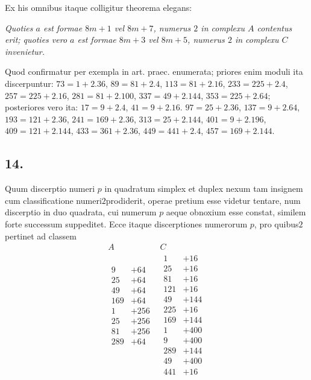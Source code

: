 \documentclass[twoside,12pt, showframe]{memoir}
\begin{document}
Ex his omnibus itaque colligitur theorema elegans:
 
\textit{Quoties \(a\) est formae \(8 m+1\) vel \(8 m+7\), numerus \(2\) in complexu \(A\) contentus erit; quoties vero \(a\) est formae \(8 m+3\) vel \(8 m+5\), numerus \(2\) in complexu \(C\) invenietur.}
 
Quod confirmatur per exempla in art. praec. enumerata; priores enim moduli ita discerpuntur: \(73=1+2.36\), \(89=81+2.4\), \(113=81+2.16\), \(233=225+2.4\), \(257=225+2.16\), \(281=81+2.100\), \(337=49+2.144\), \(353=225+2.64\); posteriores vero ita: \(17=9+2.4\), \(41=9+2.16\). \(97=25+2.36\), \(137=9+2.64\), \(193=121+2.36\), \(241=169+2.36\), \(313=25+2.144\), \(401=9+2.196\), \(409=121+2.144\), \(433=361+2.36\), \(449=441+2.4\), \(457=169+2.144\).

\subsection*{14.}
 
Quum discerptio numeri \(p\) in quadratum simplex et duplex nexum tam insignem cum classificatione numeri\(2\)prodiderit, operae pretium esse videtur tentare, num discerptio in duo quadrata, cui numerum \(p\) aeque obnoxium esse constat, similem forte successum suppeditet. Ecce itaque discerptiones numerorum \(p\), pro quibus\(2\)pertinet ad classem
\[\begin{array}{c|c}
A & C  \\[2pt]
\hline 
\begin{aligned}
9&+64  \\
25&+64  \\
49&+64 \\
169&+64\\
1&+256 \\
25&+256\\
81&+256\\
289&+64\\
\\
\\
\\
\\
 \end{aligned}
&
\begin{aligned}
 1&+16\\
 25&+16\\
 81&+16\\
 121&+16\\
 49&+144\\
225&+16\\
 169&+144\\
 1&+400\\
9&+400\\
289&+144\\
49&+400\\
441&+16 
\end{aligned}
\end{array}\]\clearpage\noindent%
\end{document}
